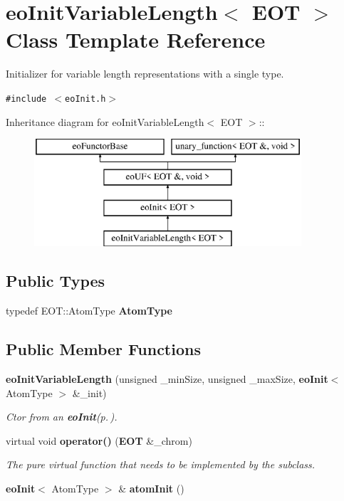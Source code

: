 \section{eo\-Init\-Variable\-Length$<$ EOT $>$ Class Template Reference}
\label{classeo_init_variable_length}
Initializer for variable length representations with a single type.  


{\tt \#include $<$eo\-Init.h$>$}

Inheritance diagram for eo\-Init\-Variable\-Length$<$ EOT $>$::\begin{figure}[H]
\begin{center}
\leavevmode
\includegraphics[height=4cm]{classeo_init_variable_length}
\end{center}
\end{figure}
\subsection*{Public Types}
\begin{CompactItemize}
\item 
typedef EOT::Atom\-Type {\bf Atom\-Type}\label{classeo_init_variable_length_w0}

\end{CompactItemize}
\subsection*{Public Member Functions}
\begin{CompactItemize}
\item 
{\bf eo\-Init\-Variable\-Length} (unsigned \_\-min\-Size, unsigned \_\-max\-Size, {\bf eo\-Init}$<$ Atom\-Type $>$ \&\_\-init)\label{classeo_init_variable_length_a0}

\begin{CompactList}\small\item\em Ctor from an {\bf eo\-Init}{\rm (p.\,\pageref{classeo_init})}. \item\end{CompactList}\item 
virtual void {\bf operator()} ({\bf EOT} \&\_\-chrom)\label{classeo_init_variable_length_a1}

\begin{CompactList}\small\item\em The pure virtual function that needs to be implemented by the subclass. \item\end{CompactList}\item 
{\bf eo\-Init}$<$ Atom\-Type $>$ \& {\bf atom\-Init} ()\label{classeo_init_variable_length_a2}

\end{CompactItemize}
